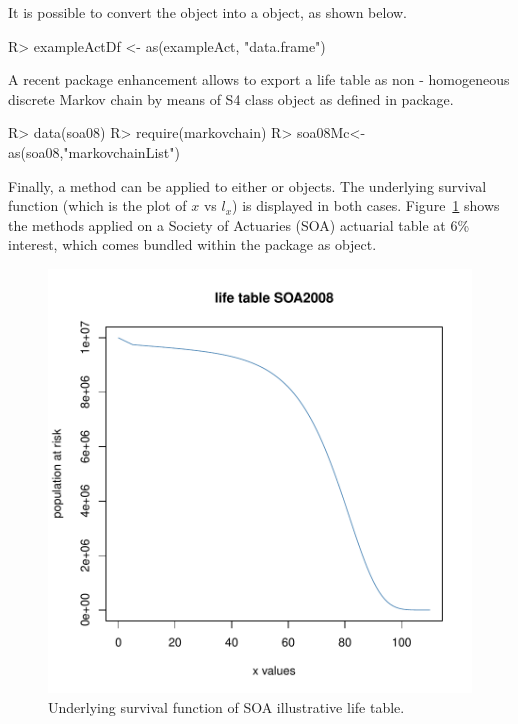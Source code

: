 \documentclass[nojss]{jss}
\begin{document}
It is possible to convert the  object into a
 object, as shown below.

\begin{Schunk}
\begin{Sinput}
R> exampleActDf <- as(exampleAct, "data.frame")
\end{Sinput}
\end{Schunk}

A recent  package enhancement allows to export a life
table as non - homogeneous discrete Markov chain by means of
 S4 class object as defined in 
\citep{markovchainR}  package.

\begin{Schunk}
\begin{Sinput}
R> data(soa08)
R> require(markovchain)
R> soa08Mc<-as(soa08,"markovchainList")
\end{Sinput}
\end{Schunk}

Finally, a  method can be applied to either or
 objects. The underlying survival function (which is the plot of $x$ vs $l_x$) is displayed in both cases. 
Figure~\ref{fig:SoaLt} shows the  methods applied on a Society of
Actuaries (SOA) actuarial table at 6\% interest, which comes bundled within the
 package as  object.



\begin{figure}
\begin{center}
\includegraphics{an_introduction_to_lifecontingencies_package-figSurvivalFunction}
\caption{Underlying survival function of SOA illustrative life table.}
\label{fig:SoaLt}
\end{center}
\end{figure}
\end{document}
